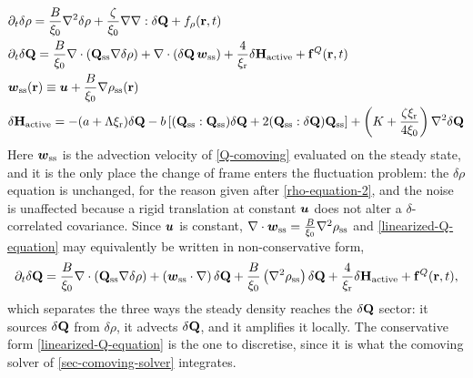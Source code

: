 \documentclass[a5paper]{article}
\begin{document}
\begin{subequations}
    \label{linearized-equations}
\begin{align}
    &\partial_t \delta\rho = \frac{B}{\xi_0}\nabla^2 \delta\rho + \frac{\zeta}{\xi_0} \nabla\nabla:\delta \mathbf{Q} + f_\rho(\mathbf{r}, t)
    \label{linearized-rho-equation}
    \\
    &\partial_t \delta \mathbf{Q} =
    \frac{B}{\xi_0} \nabla\cdot\left(\mathbf{Q}_{\mathrm{ss}} \nabla \delta \rho\right)
    + \nabla\cdot\left(\delta \mathbf{Q}\, \boldsymbol w_{\mathrm{ss}}\right)
    +\frac{4}{\xi_{\rm r}}\delta\mathbf{H}_\text{active} + \mathbf{f}^Q(\mathbf{r}, t)
    \label{linearized-Q-equation}
    \\
    &\boldsymbol w_{\mathrm{ss}}(\mathbf{r}) \equiv \boldsymbol{u} + \frac{B}{\xi_0}\nabla \rho_{\mathrm{ss}}(\mathbf{r})
    \label{w-steady}
    \\
    &\delta\mathbf{H}_\text{active} = - (a+\Lambda \xi_{\rm r}) \delta \mathbf{Q}
    - b \left[(\mathbf{Q}_{\mathrm{ss}}:\mathbf{Q}_{\mathrm{ss}})\delta \mathbf{Q} + 2 (\mathbf{Q}_{\mathrm{ss}}:\delta \mathbf{Q}) \mathbf{Q}_{\mathrm{ss}}\right] + \left(K+\frac{\zeta\xi_{\rm r}}{4\xi_0}\right) \nabla^2 \delta \mathbf{Q}
\end{align}
\end{subequations}
Here $\boldsymbol w_{\mathrm{ss}}$ is the advection velocity of \eqref{Q-comoving} evaluated on the steady state, and it is the only place the change of frame enters the fluctuation problem: the $\delta\rho$ equation is unchanged, for the reason given after \eqref{rho-equation-2}, and the noise is unaffected because a rigid translation at constant $\boldsymbol{u}$ does not alter a $\delta$-correlated covariance. Since $\boldsymbol{u}$ is constant, $\nabla\cdot\boldsymbol w_{\mathrm{ss}} = \frac{B}{\xi_0}\nabla^2\rho_{\mathrm{ss}}$ and \eqref{linearized-Q-equation} may equivalently be written in non-conservative form,
\begin{align}
    \label{linearized-Q-expanded}
    \partial_t \delta \mathbf{Q} = \frac{B}{\xi_0}\nabla\cdot\left(\mathbf{Q}_{\mathrm{ss}} \nabla \delta \rho\right)
    + \left(\boldsymbol w_{\mathrm{ss}}\cdot\nabla\right)\delta \mathbf{Q}
    + \frac{B}{\xi_0}\left(\nabla^2\rho_{\mathrm{ss}}\right)\delta \mathbf{Q}
    +\frac{4}{\xi_{\rm r}}\delta\mathbf{H}_\text{active} + \mathbf{f}^Q(\mathbf{r}, t),
\end{align}
which separates the three ways the steady density reaches the $\delta\mathbf{Q}$ sector: it sources $\delta\mathbf{Q}$ from $\delta\rho$, it advects $\delta\mathbf{Q}$, and it amplifies it locally. The conservative form \eqref{linearized-Q-equation} is the one to discretise, since it is what the comoving solver of \cref{sec-comoving-solver} integrates.
\end{document}
